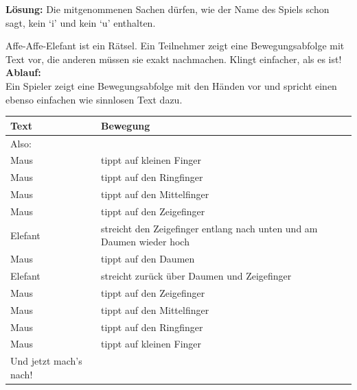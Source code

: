 \textbf{Lösung:}
Die mitgenommenen Sachen dürfen, wie der Name des Spiels schon sagt, kein ‘i’ und kein ‘u’ enthalten.




Affe-Affe-Elefant ist ein Rätsel. Ein Teilnehmer zeigt eine Bewegungsabfolge mit Text vor, die anderen müssen sie exakt nachmachen. Klingt einfacher, als es ist!\\
\textbf{Ablauf:}\\
Ein Spieler zeigt eine Bewegungsabfolge mit den Händen vor und spricht einen ebenso einfachen wie sinnlosen Text dazu.
\begin{table}[h]
    \begin{tabular}{|l|l|}
    \hline
         \textbf{Text} & \textbf{Bewegung}  \\ \hline 
         Also: & \\ \hline
         Maus & tippt auf kleinen Finger \\ \hline
         Maus   &        tippt auf den Ringfinger \\ \hline
         Maus & tippt auf den Mittelfinger \\ \hline
         Maus & tippt auf den Zeigefinger \\ \hline
         Elefant & streicht den Zeigefinger entlang nach unten und am Daumen wieder hoch \\ \hline
         Maus & tippt auf den Daumen \\ \hline
         Elefant & streicht zurück über Daumen und Zeigefinger \\ \hline
         Maus & tippt auf den Zeigefinger\\ \hline
         Maus & tippt auf den Mittelfinger \\ \hline
         Maus & tippt auf den Ringfinger \\ \hline
         Maus & tippt auf kleinen Finger \\ \hline
         Und jetzt mach's nach! & \\ \hline
         
    \end{tabular}
\end{table}

